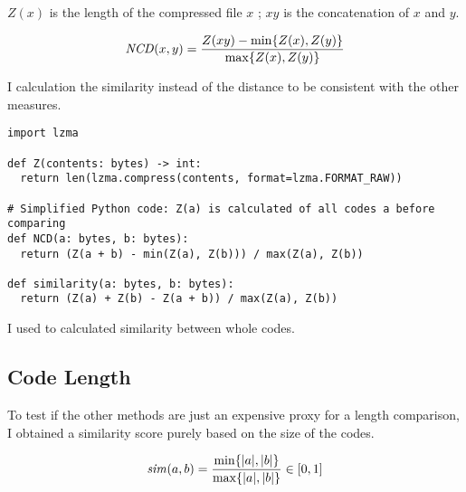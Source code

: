 \documentclass[../main.tex]{subfiles}
\begin{document}
$Z(x)$ is the length of the compressed file $x$ ; $xy$ is the concatenation of $x$ and $y$.

\begin{equation}
  \mbox{\textit{NCD}}(x,y) = \dfrac{Z(xy) - \min\{Z(x), Z(y)\}}{\max \{Z(x), Z(y)\}}
\end{equation}

I calculation the similarity instead of the distance to be consistent with the other measures.

\begin{lstlisting}[style=pymd]
import lzma

def Z(contents: bytes) -> int:
  return len(lzma.compress(contents, format=lzma.FORMAT_RAW))

# Simplified Python code: Z(a) is calculated of all codes a before comparing
def NCD(a: bytes, b: bytes):
  return (Z(a + b) - min(Z(a), Z(b))) / max(Z(a), Z(b))

def similarity(a: bytes, b: bytes):
  return (Z(a) + Z(b) - Z(a + b)) / max(Z(a), Z(b))
\end{lstlisting}

I used  to calculated similarity between whole codes.

\subsection{Code Length \label{sec:size}}

To test if the other methods are just an expensive proxy for a length comparison, I obtained a similarity score purely based on the size of the codes.

\begin{equation}
  \mbox{\textit{sim}}(a, b) = \dfrac{\min\{|a|,|b|\}}{\max\{|a|,|b|\}} \in [0,1]
  \label{eq:size}
\end{equation}
\end{document}
